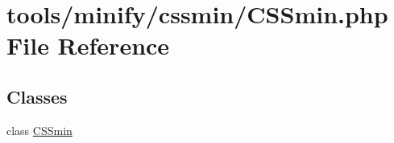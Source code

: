 \hypertarget{CSSmin_8php}{\section{tools/minify/cssmin/\+C\+S\+Smin.php File Reference}
\label{CSSmin_8php}
}
\subsection*{Classes}
\begin{DoxyCompactItemize}
\item 
class \hyperlink{classCSSmin}{C\+S\+Smin}
\end{DoxyCompactItemize}

